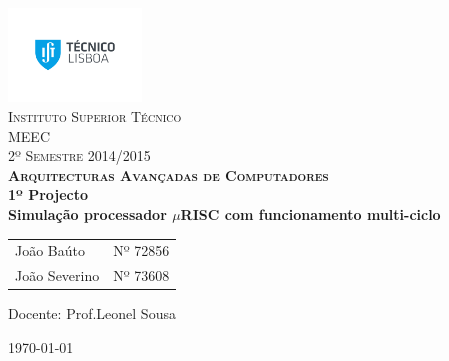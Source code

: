 \begin{titlepage}
	
	\begin{center}
		
		\includegraphics[trim = 4cm 4cm 4cm 4cm, keepaspectratio=true, height=2.5cm]{./images/IST_LOGO.pdf}~\\[0.5cm]
		
		\textsc{\LARGE Instituto Superior Técnico\\[0.5cm]
		               MEEC\\[0.5cm]
		               2º Semestre 2014/2015\\[2cm]
		               \huge \bfseries Arquitecturas Avançadas de Computadores}\\[1cm]
		
		\huge \bfseries 1º Projecto \\[1cm]
		\huge \bfseries Simulação processador $\mu$RISC com funcionamento	multi-ciclo
		\\[0.5cm]
		\vfill
		\large
\begin{tabular}{l r}
João Baúto &  Nº 72856\\
João Severino & Nº 73608\\
\end{tabular}

		\vfill
		\begin{center}
		Docente: Prof.Leonel Sousa
		\end{center}
		\vfill
		{\large \today}

	\end{center}
	
	\cleardoublepage
	\setcounter{page}{1}
\end{titlepage}
